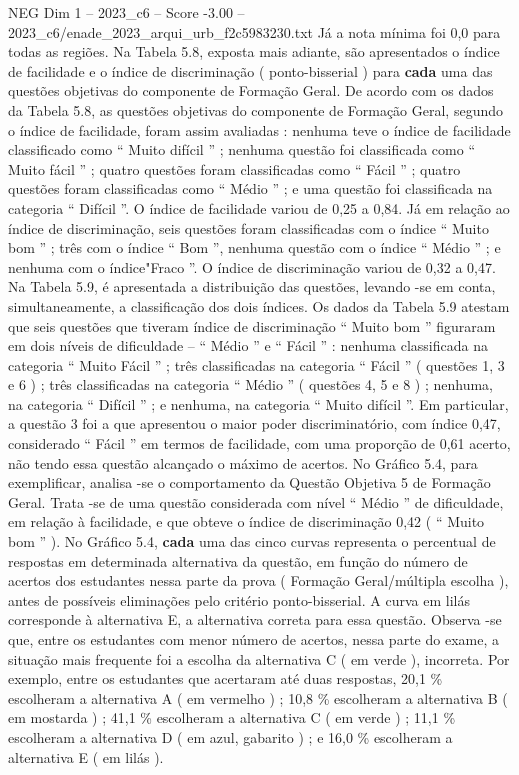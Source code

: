\begin{textsample}{NEG Dim 1 – 2023\_c6 – Score -3.00 – 2023\_c6/enade\_2023\_arqui\_urb\_f2c5983230.txt}
Já a nota mínima foi 0,0 para todas as regiões.
Na Tabela 5.8, exposta mais adiante, são apresentados o índice de facilidade e o índice de discriminação ( ponto-bisserial ) para \textbf{cada} uma das questões objetivas do componente de Formação Geral.
De acordo com os dados da Tabela 5.8, as questões objetivas do componente de Formação Geral, segundo o índice de facilidade, foram assim avaliadas : nenhuma teve o índice de facilidade classificado como “ Muito difícil ” ; nenhuma questão foi classificada como “ Muito fácil ” ; quatro questões foram classificadas como “ Fácil ” ; quatro questões foram classificadas como “ Médio ” ; e uma questão foi classificada na categoria “ Difícil ”.
O índice de facilidade variou de 0,25 a 0,84.
Já em relação ao índice de discriminação, seis questões foram classificadas com o índice “ Muito bom ” ; três com o índice “ Bom ”, nenhuma questão com o índice “ Médio ” ; e nenhuma com o índice"Fraco ”.
O índice de discriminação variou de 0,32 a 0,47.
Na Tabela 5.9, é apresentada a distribuição das questões, levando -se em conta, simultaneamente, a classificação dos dois índices.
Os dados da Tabela 5.9 atestam que seis questões que tiveram índice de discriminação “ Muito bom ” figuraram em dois níveis de dificuldade – “ Médio ” e “ Fácil ” : nenhuma classificada na categoria “ Muito Fácil ” ; três classificadas na categoria “ Fácil ” ( questões 1, 3 e 6 ) ; três classificadas na categoria “ Médio ” ( questões 4, 5 e 8 ) ; nenhuma, na categoria “ Difícil ” ; e nenhuma, na categoria “ Muito difícil ”.
Em particular, a questão 3 foi a que apresentou o maior poder discriminatório, com índice 0,47, considerado “ Fácil ” em termos de facilidade, com uma proporção de 0,61 acerto, não tendo essa questão alcançado o máximo de acertos.
No Gráfico 5.4, para exemplificar, analisa -se o comportamento da Questão Objetiva 5 de Formação Geral.
Trata -se de uma questão considerada com nível “ Médio ” de dificuldade, em relação à facilidade, e que obteve o índice de discriminação 0,42 ( “ Muito bom ” ).
No Gráfico 5.4, \textbf{cada} uma das cinco curvas representa o percentual de respostas em determinada alternativa da questão, em função do número de acertos dos estudantes nessa parte da prova ( Formação Geral/múltipla escolha ), antes de possíveis eliminações pelo critério ponto-bisserial.
A curva em lilás corresponde à alternativa E, a alternativa correta para essa questão.
Observa -se que, entre os estudantes com menor número de acertos, nessa parte do exame, a situação mais frequente foi a escolha da alternativa C ( em verde ), incorreta.
Por exemplo, entre os estudantes que acertaram até duas respostas, 20,1 \% escolheram a alternativa A ( em vermelho ) ; 10,8 \% escolheram a alternativa B ( em mostarda ) ; 41,1 \% escolheram a alternativa C ( em verde ) ; 11,1 \% escolheram a alternativa D ( em azul, gabarito ) ; e 16,0 \% escolheram a alternativa E ( em lilás ).

\end{textsample}
